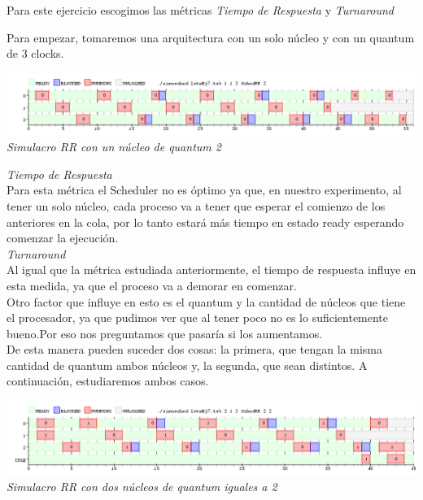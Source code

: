 Para este ejercicio escogimos las m\'etricas \textit{Tiempo de Respuesta} y \textit{Turnaround}

Para empezar, tomaremos una arquitectura con un solo n\'ucleo y con un quantum de 3 clocks.\\
\vspace{\baselineskip}
\begin{center}
\includegraphics[scale=0.45]{../tp1/Test/resEj7Co1.png}
\\
\vspace{1pt}
\footnotesize\textit{Simulacro RR con un n\'ucleo de quantum 2}
\end{center}
\vspace{\baselineskip}


\textit{Tiempo de Respuesta}\\
Para esta m\'etrica el Scheduler no es \'optimo ya que, en nuestro experimento, al tener un solo n\'ucleo, cada proceso va a tener que esperar el comienzo de los anteriores en la cola, por lo tanto estar\'a m\'as tiempo en estado ready esperando comenzar la ejecuci\'on.\\
\textit{Turnaround}\\
Al igual que la m\'etrica estudiada anteriormente, el tiempo de respuesta influye en esta medida, ya que el proceso va a demorar en comenzar. \\
Otro factor que influye en esto es el quantum y la cantidad de n\'ucleos que tiene el procesador, ya que pudimos ver que al tener poco no es lo suficientemente bueno.Por eso nos preguntamos que pasar\'ia si los aumentamos.\\
De esta manera pueden suceder dos cosas: la primera, que tengan la misma cantidad de quantum ambos n\'ucleos y, la segunda, que sean distintos.
A continuaci\'on, estudiaremos ambos casos.\\
\vspace{\baselineskip}
\begin{center}
\includegraphics[scale=0.45]{../tp1/Test/resEj7Co2.png}
\\
\vspace{1pt}
\footnotesize\textit{Simulacro RR con dos n\'ucleos de quantum iguales a 2}
\end{center}
\vspace{\baselineskip}

